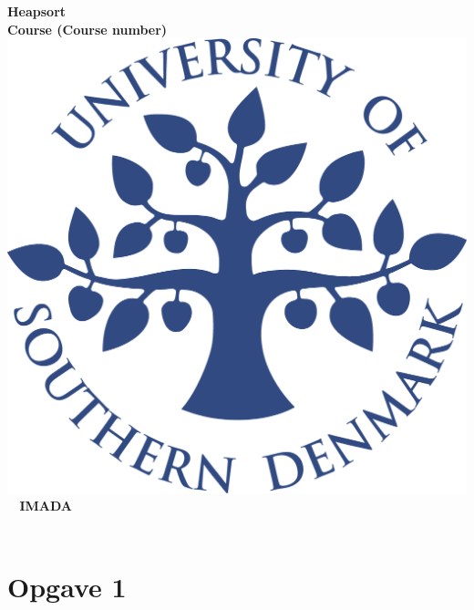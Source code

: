 \documentclass[a4paper,10pt,titlepage]{report}
\date{}
\begin{document}
\begin{titlepage}
\centering
    \vspace*{9\baselineskip}
    \huge
    \bfseries
    Heapsort \\

    \normalfont
	\huge
    Course (Course number)  \\[4\baselineskip]
    \normalfont
	\includegraphics[scale=0.2]{SDU_logo}
    \vfill\
    \vspace{5mm}
    IMADA \\
    \vspace{5mm}
    \textbf{\datedate}  \bf{} \\[2\baselineskip]
\end{titlepage}

\renewcommand{\thepage}{\roman{page}}%
\tableofcontents

\newpage
\setcounter{page}{1}
\renewcommand{\thepage}{\arabic{page}}
\section{Opgave 1}
\end{document}
